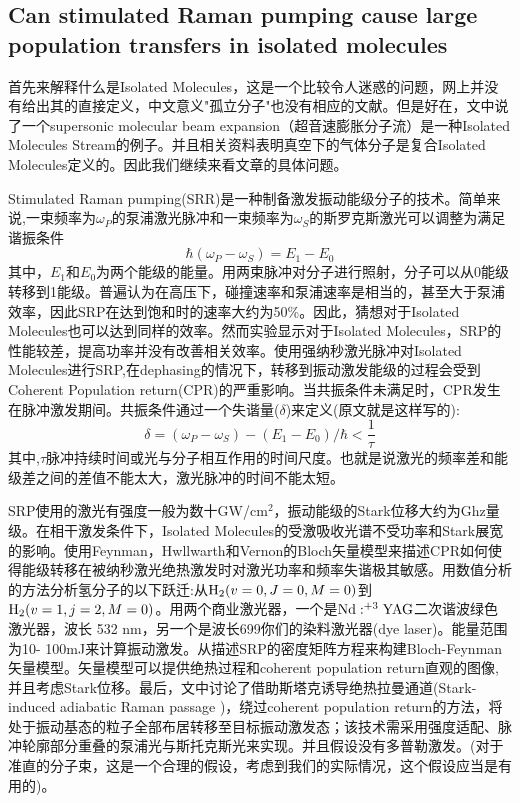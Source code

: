 \documentclass{article}
\numberwithin{equation}{subsection} %
\numberwithin{figure}{subsection} %
\numberwithin{table}{subsection} %
\begin{document}
\subsection{Can stimulated Raman pumping cause large population transfers in isolated molecules\cite{mukherjee_can_2011}}
首先来解释什么是Isolated Molecules，这是一个比较令人迷惑的问题，网上并没有给出其的直接定义，中文意义"孤立分子"也没有相应的文献。但是好在，文中说了一个supersonic molecular beam expansion（超音速膨胀分子流）是一种Isolated Molecules Stream的例子。并且相关资料表明真空下的气体分子是复合Isolated Molecules定义的。因此我们继续来看文章的具体问题。

Stimulated Raman pumping(SRR)是一种制备激发振动能级分子的技术。简单来说,一束频率为$\omega_P$的泵浦激光脉冲和一束频率为$\omega_S$的斯罗克斯激光可以调整为满足谐振条件
\begin{equation}
    \hbar (\omega_P - \omega_S) = E_1 - E_0
    \label{eq:resonance_condition_in_SRR}
\end{equation}
其中，$E_1$和$E_0$为两个能级的能量。用两束脉冲对分子进行照射，分子可以从0能级转移到1能级。普遍认为在高压下，碰撞速率和泵浦速率是相当的，甚至大于泵浦效率，因此SRP在达到饱和时的速率大约为50\%。因此，猜想对于Isolated Molecules也可以达到同样的效率。然而实验显示对于Isolated Molecules，SRP的性能较差，提高功率并没有改善相关效率。使用强纳秒激光脉冲对Isolated Molecules进行SRP,在dephasing的情况下，转移到振动激发能级的过程会受到Coherent Population return(CPR)的严重影响。当共振条件未满足时，CPR发生在脉冲激发期间。共振条件通过一个失谐量($\delta$)来定义(原文就是这样写的):
\begin{equation}
    \delta = (\omega_P - \omega_S) - (E_1 - E_0)/\hbar < \frac{1}{\tau}
    \label{eq:resonance_condition_in_CPR}
\end{equation}
其中,$\tau$脉冲持续时间或光与分子相互作用的时间尺度。也就是说激光的频率差和能级差之间的差值不能太大，激光脉冲的时间不能太短。

SRP使用的激光有强度一般为数十GW/cm$^2$，振动能级的Stark位移大约为Ghz量级。在相干激发条件下，Isolated Molecules的受激吸收光谱不受功率和Stark展宽的影响。使用Feynman，Hwllwarth和Vernon的Bloch矢量模型来描述CPR如何使得能级转移在被纳秒激光绝热激发时对激光功率和频率失谐极其敏感。用数值分析的方法分析氢分子的以下跃迁:从$\ce{H2}(v=0,J=0,M=0)$到$\ce{H2}(v=1,j=2,M=0)$。用两个商业激光器，一个是$\ce{Nd}:^{+3}\ce{YAG}$二次谐波绿色激光器，波长 532 nm，另一个是波长699你们的染料激光器(dye laser)。能量范围为10- 100mJ来计算振动激发。从描述SRP的密度矩阵方程来构建Bloch-Feynman矢量模型。矢量模型可以提供绝热过程和coherent population return直观的图像,并且考虑Stark位移。最后，文中讨论了借助斯塔克诱导绝热拉曼通道(Stark-induced adiabatic Raman passage )，绕过coherent population return的方法，将处于振动基态的粒子全部布居转移至目标振动激发态；该技术需采用强度适配、脉冲轮廓部分重叠的泵浦光与斯托克斯光来实现。并且假设没有多普勒激发。(对于准直的分子束，这是一个合理的假设，考虑到我们的实际情况，这个假设应当是有用的)。
\end{document}
